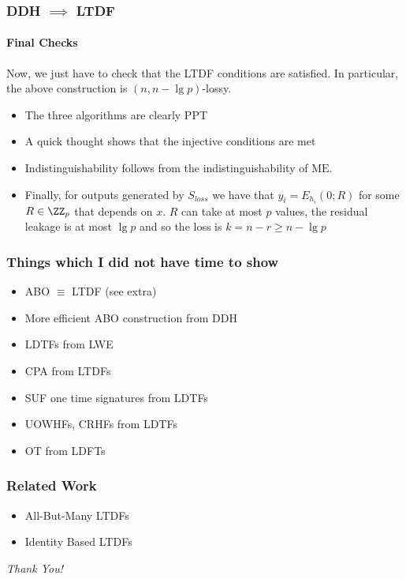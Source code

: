 \documentclass{beamer}
\begin{document}
\begin{frame}
    \frametitle{DDH $\implies$ LTDF}
    \framesubtitle{Final Checks}
    Now, we just have to check that the LTDF conditions are satisfied.
    In particular, the above construction is $(n, n - \lg p)$-lossy.
    \begin{itemize}
        \item The three algorithms are clearly PPT
        \item A quick thought shows that the injective conditions are met
        \item Indistinguishability follows from the indistinguishability of $\mathrm{ME}$.
        \item Finally, for outputs generated by $S_{loss}$ we have that
              $y_i = E_{h_i}(0; R)$ for some $R \in \ZZ_p$ that depends on $x$. $R$ can take
              at most $p$ values, the residual leakage is at most $\lg p$ and so the loss is
              $k = n - r \geq n - \lg p$
    \end{itemize}
\end{frame}

\begin{frame}
    \frametitle{Things which I did not have time to show}
    \begin{itemize}
        \item ABO $\equiv$ LTDF (see extra)
        \item More efficient ABO construction from DDH
        \item LDTFs from LWE
        \item CPA from LTDFs
        \item SUF one time signatures from LDTFs
        \item UOWHFs, CRHFs from LDTFs
        \item OT from LDFTs
    \end{itemize}
\end{frame}

\begin{frame}
    \frametitle{Related Work}
    \begin{itemize}
        \item All-But-Many LTDFs
        \item Identity Based LTDFs
    \end{itemize}
\end{frame}

\begin{frame}{}
    \centering \Large
    \emph{Thank You!}
\end{frame}
\end{document}

